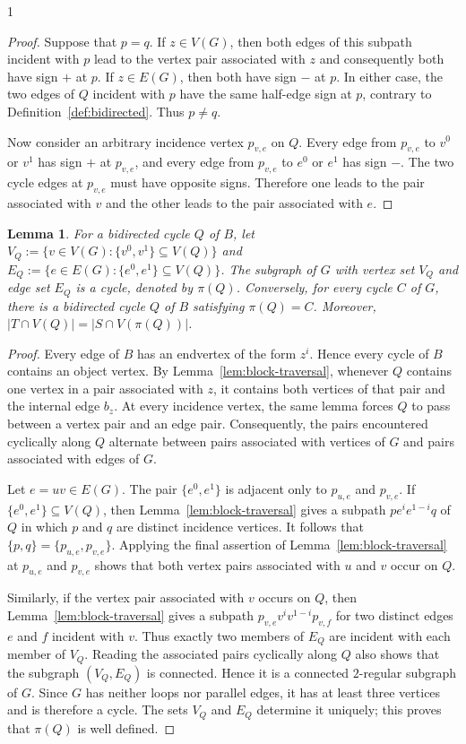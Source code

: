 \documentclass[a4paper,11pt]{article}
\theoremstyle{plain}
\newtheorem{lemma}[theorem]{Lemma}
\theoremstyle{definition}
\theoremstyle{remark}
\begin{document}
\begin{spacing}{1}
\begin{proof}
Suppose that $p=q$.  If $z\in V(G)$, then both edges of this subpath incident
with $p$ lead to the vertex pair associated with $z$ and consequently both
have sign $+$ at $p$.  If $z\in E(G)$, then both have sign $-$ at $p$.
In either case, the two edges of $Q$ incident with $p$ have the same
half-edge sign at $p$, contrary to Definition~\ref{def:bidirected}.  Thus
$p\neq q$.

Now consider an arbitrary incidence vertex $p_{v,e}$ on $Q$.  Every edge from
$p_{v,e}$ to $v^0$ or $v^1$ has sign $+$ at $p_{v,e}$, and every edge from
$p_{v,e}$ to $e^0$ or $e^1$ has sign $-$.  The two cycle edges at $p_{v,e}$
must have opposite signs.  Therefore one leads to the pair associated with
$v$ and the other leads to the pair associated with $e$.
\end{proof}

\begin{lemma}\label{lem:cycle-correspondence}
For a bidirected cycle $Q$ of $B$, let
$V_Q:=\{v\in V(G):\{v^0,v^1\}\subseteq V(Q)\}$ and
$E_Q:=\{e\in E(G):\{e^0,e^1\}\subseteq V(Q)\}$.  The subgraph of $G$ with
vertex set $V_Q$ and edge set $E_Q$ is a cycle, denoted by $\pi(Q)$.
Conversely, for every cycle $C$ of $G$, there is a bidirected cycle $Q$ of
$B$ satisfying $\pi(Q)=C$.  Moreover,
$|T\cap V(Q)|=|S\cap V(\pi(Q))|$.
\end{lemma}

\begin{proof}
Every edge of $B$ has an endvertex of the form $z^i$.  Hence every cycle of $B$
contains an object vertex.  By Lemma~\ref{lem:block-traversal}, whenever $Q$
contains one vertex in a pair associated with $z$, it contains both vertices
of that pair and the internal edge $b_z$.  At every incidence vertex, the same
lemma forces $Q$ to pass between a vertex pair and an edge pair.  Consequently,
the pairs encountered cyclically along $Q$ alternate between pairs associated
with vertices of $G$ and pairs associated with edges of $G$.

Let $e=uv\in E(G)$.  The pair $\{e^0,e^1\}$ is adjacent only to
$p_{u,e}$ and $p_{v,e}$.  If $\{e^0,e^1\}\subseteq V(Q)$, then
Lemma~\ref{lem:block-traversal} gives a subpath
$pe^ie^{1-i}q$ of $Q$ in which $p$ and $q$ are distinct incidence
vertices.  It follows that $\{p,q\}=\{p_{u,e},p_{v,e}\}$.  Applying the final
assertion of Lemma~\ref{lem:block-traversal} at $p_{u,e}$ and $p_{v,e}$ shows
that both vertex pairs associated with $u$ and $v$ occur on $Q$.

Similarly, if the vertex pair associated with $v$ occurs on $Q$, then
Lemma~\ref{lem:block-traversal} gives a subpath
$p_{v,e}v^iv^{1-i}p_{v,f}$ for two distinct edges $e$ and $f$ incident
with $v$.  Thus exactly two members of $E_Q$ are incident with each member of
$V_Q$.  Reading the associated pairs cyclically along $Q$ also shows that the
subgraph $(V_Q,E_Q)$ is connected.  Hence it is a connected $2$-regular
subgraph of $G$.  Since $G$ has neither loops nor parallel edges, it has at
least three vertices and is therefore a cycle.  The sets $V_Q$ and $E_Q$
determine it uniquely; this proves that $\pi(Q)$ is well defined.


\end{proof}
\end{spacing}
\end{document}
